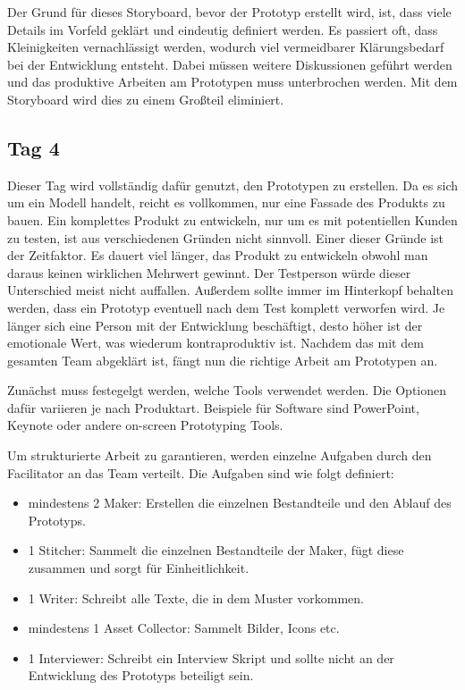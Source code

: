 Der Grund für dieses Storyboard, bevor der Prototyp erstellt wird, ist, dass viele Details im Vorfeld geklärt und eindeutig definiert werden. Es passiert oft, dass Kleinigkeiten vernachlässigt werden, wodurch viel vermeidbarer Klärungsbedarf bei der Entwicklung entsteht. Dabei müssen weitere Diskussionen geführt werden und das produktive Arbeiten am Prototypen muss unterbrochen werden. Mit dem Storyboard wird dies zu einem Großteil eliminiert.

\subsection*{Tag 4}
Dieser Tag wird vollständig dafür genutzt, den Prototypen zu erstellen. Da es sich um ein Modell handelt, reicht es vollkommen, nur eine Fassade des Produkts zu bauen. Ein komplettes Produkt zu entwickeln, nur um es mit potentiellen Kunden zu testen, ist aus verschiedenen Gründen nicht sinnvoll. Einer dieser Gründe ist der Zeitfaktor. Es dauert viel länger, das Produkt zu entwickeln obwohl man daraus keinen wirklichen Mehrwert gewinnt. Der Testperson würde dieser Unterschied meist nicht auffallen. Außerdem sollte immer im Hinterkopf behalten werden, dass ein Prototyp eventuell nach dem Test komplett verworfen wird. Je länger sich eine Person mit der Entwicklung beschäftigt, desto höher ist der emotionale Wert, was wiederum kontraproduktiv ist. Nachdem das mit dem gesamten Team abgeklärt ist, fängt nun die richtige Arbeit am Prototypen an.

Zunächst muss festegelgt werden, welche Tools verwendet werden. Die Optionen dafür variieren je nach Produktart. Beispiele für Software sind PowerPoint, Keynote oder andere on-screen Prototyping Tools.

Um strukturierte Arbeit zu garantieren, werden einzelne Aufgaben durch den Facilitator an das Team verteilt. Die Aufgaben sind wie folgt definiert:
\begin{itemize}
	\item mindestens 2 Maker:
	Erstellen die einzelnen Bestandteile und den Ablauf des Prototyps.
	\item 1 Stitcher:
	Sammelt die einzelnen Bestandteile der Maker, fügt diese zusammen und sorgt für Einheitlichkeit.
	\item 1 Writer:
	Schreibt alle Texte, die in dem Muster vorkommen.
	\item mindestens 1 Asset Collector:
	Sammelt Bilder, Icons etc.
	\item 1 Interviewer:
	Schreibt ein Interview Skript und sollte nicht an der Entwicklung des Prototyps beteiligt sein.
\end{itemize}


